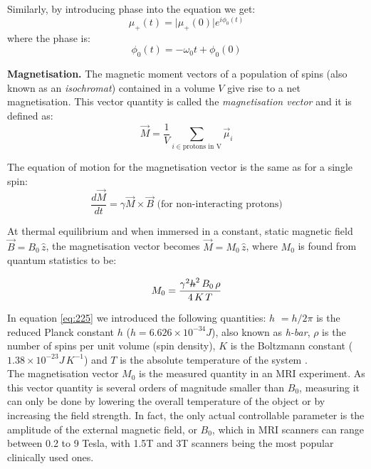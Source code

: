 Similarly, by introducing phase into the equation we get:
\begin{equation} \label{eq:244}
	\mu_+(t) = \lvert \mu_+(0) \rvert e^{i \phi_0(t)}
\end{equation}
where the phase is:
\begin{equation} \label{eq:245}
	\phi_0(t) = -\omega_0 t + \phi_0(0)
\end{equation}

\hfill

\textbf{Magnetisation.} The magnetic moment vectors of a population of spins 
(also known as an \textit{isochromat}) contained in a volume $V$ give rise to 
a net magnetisation. This vector quantity is called the 
\textit{magnetisation vector} and it is defined as:
\begin{equation} \label{eq:219}
    \vec{M} = \frac{1}{V} \sum_{i \in \text{protons in V}} \vec{\mu}_i
\end{equation}

The equation of motion for the magnetisation vector is the same as for a single spin:
\begin{equation} \label{eq:43}
    \frac{d\vec{M}}{dt} = \gamma \vec{M} \times \vec{B}  \text{  (for non-interacting protons)}
\end{equation}

At thermal equilibrium and when immersed in a constant, static magnetic field 
$\vec{B} = B_0 \, \hat{z}$, the magnetisation vector becomes $\vec{M} = M_0 \, \hat{z}$,
where $M_0$ is found from quantum statistics to be:

\begin{equation} \label{eq:225}
    M_0 = \frac{\gamma^2 \text{\sout{$h$}}^2 \, B_0 \, \rho}{4 \, K \, T}
\end{equation}

In equation \ref{eq:225} we introduced the following quantities: \sout{$h$} $= h/2\pi$ is the reduced Planck constant $h$ ($h = 6.626 \times 10^{-34} J$), also known as \textit{h-bar}, $\rho$ is the number of spins per unit volume 
(spin density), $K$ is the Boltzmann constant 
($1.38 \times 10^{-23} J \, K^{-1}$) and $T$ is the absolute temperature of the system \cite{Haacke1999}. \\

The magnetisation vector $M_0$ is the measured quantity in an MRI experiment. 
As this vector quantity is several orders of magnitude smaller than $B_0$, measuring it 
can only be done by lowering the overall temperature of the object or by increasing the field strength.
In fact, the only actual controllable parameter is the amplitude of the external magnetic field, or $B_0$, which in MRI scanners can range between 0.2 to 9 Tesla, with 1.5T and 3T scanners being the most popular clinically used ones.

